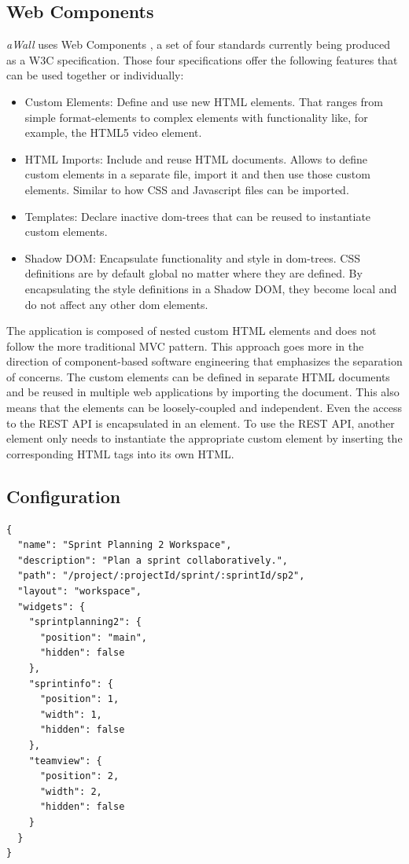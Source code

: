 \documentclass{sigchi}
\begin{document}
\subsection{Web Components}
\textit{aWall} uses Web Components \cite{webcomponents.org}, a set of four standards currently being produced as a W3C specification.
Those four specifications offer the following features that can be used together or individually:
\begin{itemize}
	\item Custom Elements: Define and use new HTML elements. 
	That ranges from simple format-elements to complex elements with functionality like, for example, the HTML5 video element.
	\item HTML Imports: Include and reuse HTML documents.
	Allows to define custom elements in a separate file,  import it and then use those custom elements. 
	Similar to how CSS and Javascript files can be imported.
	\item Templates: Declare inactive \gls{dom}-trees that can be reused to instantiate custom elements.
	\item Shadow DOM: Encapsulate functionality and style in \gls{dom}-trees.
	CSS definitions are by default global no matter where they are defined.
	By encapsulating the style definitions in a Shadow DOM, they become local and do not affect any other \gls{dom} elements.
\end{itemize}

The application is composed of nested custom HTML elements and does not follow the more traditional MVC pattern. 
This approach goes more in the direction of component-based software engineering that emphasizes the separation of concerns.
The custom elements can be defined in separate HTML documents and be reused in multiple web applications by importing the document.
This also means that the elements can be loosely-coupled and independent.
Even the access to the REST API is encapsulated in an element. 
To use the REST API, another element only needs to instantiate the appropriate custom element by inserting the corresponding HTML tags into its own HTML.


\subsection{Configuration}

\begin{lstlisting}[]
{
  "name": "Sprint Planning 2 Workspace",
  "description": "Plan a sprint collaboratively.",
  "path": "/project/:projectId/sprint/:sprintId/sp2",
  "layout": "workspace",
  "widgets": {
    "sprintplanning2": {
      "position": "main",
      "hidden": false
    },
    "sprintinfo": {
      "position": 1,
      "width": 1,
      "hidden": false
    },
    "teamview": {
      "position": 2,
      "width": 2,
      "hidden": false
    }
  }
}
\end{lstlisting}
\end{document}
